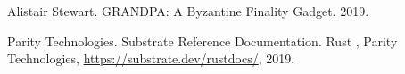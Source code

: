 \documentclass{book}
\begin{document}
\begin{thebibliography}{DGKR18}
  Alistair Stewart. {\newblock}GRANDPA:
  A Byzantine Finality Gadget. {\newblock}2019.{\newblock}
  
  Parity Technologies.
  {\newblock}Substrate Reference Documentation. {\newblock}Rust
  {}, Parity Technologies,
  \url{https://substrate.dev/rustdocs/}, 2019.{\newblock}
\end{thebibliography}

\printindex
\end{document}

